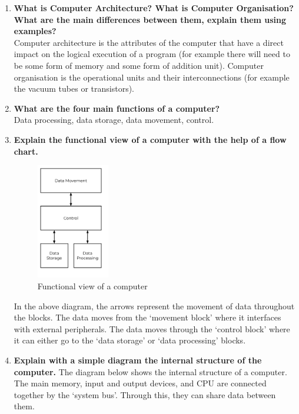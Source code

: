 
\begin{enumerate}
    \item \textbf{What is Computer Architecture? What is Computer Organisation? What are the main differences between them, explain them using examples?}\\
    Computer architecture is the attributes of the computer that have a direct impact on the logical execution of a program (for example there will need to be some form of memory and some form of addition unit). Computer organisation is the operational units and their interconnections (for example the vacuum tubes or transistors).
    \item \textbf{What are the four main functions of a computer?}\\
    Data processing, data storage, data movement, control.
    \item \textbf{Explain the functional view of a computer with the help of a flow chart.}
    \begin{figure}[H]
        \centering
        \includegraphics[width=0.3\textwidth]{assets/functional-view-computer.png}
        \caption{Functional view of a computer}
    \end{figure}
    In the above diagram, the arrows represent the movement of data throughout the blocks. The data moves from the `movement block' where it interfaces with external peripherals. The data moves through the `control block' where it can either go to the `data storage' or `data processing' blocks.
    \item \textbf{Explain with a simple diagram the internal structure of the computer.}
    The diagram below shows the internal structure of a computer. The main memory, input and output devices, and CPU are connected together by the `system bus'. Through this, they can share data between them.

\end{enumerate}
